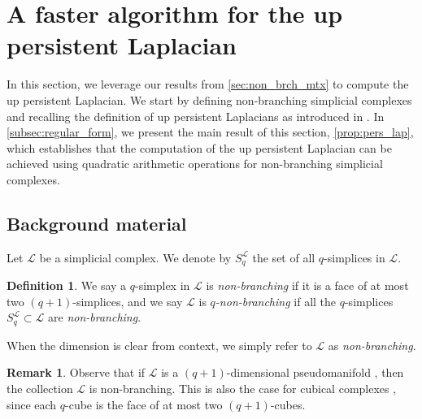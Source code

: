\documentclass{article}
\theoremstyle{definition}
\newtheorem{definition}[theorem]{Definition}
\newtheorem{remark}[theorem]{Remark}
\newcommand{\LL}{\mathcal{L}}
\begin{document}
\section{A faster algorithm for the up persistent Laplacian}\label{sec:up_pers_lap}
In this section, we leverage our results from \cref{sec:non_brch_mtx} to compute the up persistent Laplacian. We start by defining non-branching simplicial complexes and recalling the definition of up persistent Laplacians as introduced in \cite{pers_lap}. In \cref{subsec:regular_form}, we present the main result of this section, \cref{prop:pers_lap}, which establishes that the computation of the up persistent Laplacian can be achieved using quadratic arithmetic operations for non-branching simplicial complexes.

\subsection{Background material}\label{subsec:sp_cmplx}

Let $\LL$ be a simplicial complex.
We denote by $S_{q}^\LL$ the set of all $q$-simplices in $\LL$.

\begin{definition}
We say a $q$-simplex in $\LL$ is \emph{non-branching} if it is a face of at most two $(q+1)$-simplices,
and we say $\LL$ is \emph{$q$-non-branching} if all the $q$-simplices $S_q^\LL\subset \LL$ are \emph{non-branching}.
\end{definition}
When the dimension is clear from context, we simply refer to $\LL$ as \emph{non-branching}. 
\begin{remark}
    
Observe that if $\LL$ is a $(q+1)$-dimensional pseudomanifold \cite{MR575168}, then
the collection $\LL$ is non-branching.
This is also the case for cubical complexes \cite{MR3025945},
since each $q$-cube is the face of at most two $(q+1)$-cubes.
\end{remark}
\end{document}
